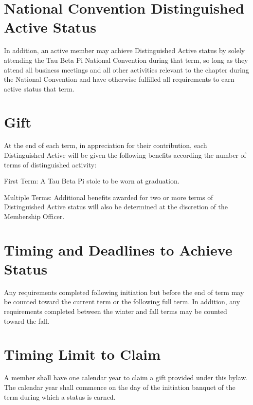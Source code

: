 \section{National Convention Distinguished Active Status} In addition, an active member may achieve Distinguished Active status by solely attending the Tau Beta Pi National Convention during that term, so long as they attend all business meetings and all other activities relevant to the chapter during the National Convention and have otherwise fulfilled all requirements to earn active status that term. %
\section{Gift} At the end of each term, in appreciation for their contribution, each Distinguished Active will be given the following benefits according the number of terms of distinguished activity:
\begin{enumsubsection}
\item{First Term:} A Tau Beta Pi stole to be worn at graduation.
\item{Multiple Terms:} Additional benefits awarded for two or more  terms of Distinguished Active status will also be determined at the discretion of the Membership Officer. %
\end{enumsubsection}
\section{Timing and Deadlines to Achieve Status} Any requirements completed following initiation but before the end of term may be counted toward the current term or the following full term. In addition, any requirements completed between the winter and fall terms may be counted toward the fall. 
\section{Timing Limit to Claim} A member shall have one calendar year to claim a gift provided under this bylaw. The calendar year shall commence on the day of the initiation banquet of the term during which a status is earned.
